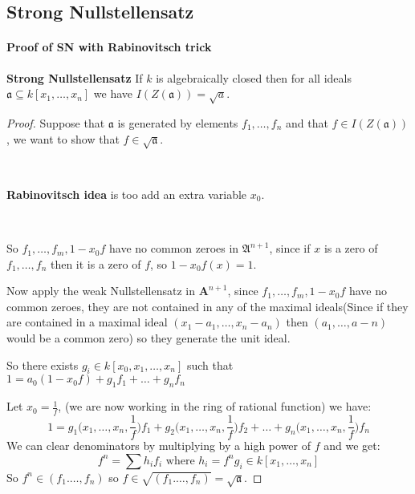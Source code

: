 \subsection{Strong Nullstellensatz}

\paragraph*{Proof of SN with Rabinovitsch trick}

\begin{theorem}\textbf{Strong Nullstellensatz}
    If $k$ is algebraically closed then for all ideals $\mathfrak{a}\subseteq k[x_1,\dots,x_n]$ we have $I(Z(\mathfrak{a})) = \sqrt{a}$.

\begin{proof}
    
Suppose that $\mathfrak{a}$ is generated by elements $f_1,\dots,f_n$ and that $f\in I(Z(\mathfrak{a}))$, we want to show that $f\in\sqrt{\mathfrak{a}}$.

\ 

\textbf{Rabinovitsch idea} is too add an extra variable $x_0$.

\

So $f_1,\dots,f_m,1-x_0f$ have no common zeroes in $\mathfrak{A}^{n+1}$, since if $x$ is a zero of $f_1,\dots,f_n$ then it is a zero of $f$, so $1-x_0f(x) = 1$.

Now apply the weak Nullstellensatz in $\mathbf{A}^{n+1}$, since $f_1,\dots,f_m,1-x_0f$ have no common zeroes, they are not contained in any of the maximal ideals(Since if they are contained in a maximal ideal $(x_1-a_1,\dots,x_n-a_n)$ then $(a_1,\dots,a-n)$ would be a common zero) so they generate the unit ideal.

So there exists $g_i\in k[x_0,x_1,\dots,x_n]$ such that $1 = a_0(1-x_0f)+g_1f_1+\dots+{g_n}{f_n}$

Let $x_0 = \frac{1}{f}$, (we are now working in the ring of rational function) we have:\begin{equation*}
    1 = g_1\bigg(x_1,\dots,x_n,\frac{1}{f}\bigg)f_1+g_2\bigg(x_1,\dots,x_n,\frac{1}{f}\bigg)f_2+\dots+g_n\bigg(x_1,\dots,x_n,\frac{1}{f}\bigg)f_n
\end{equation*}
We can clear denominators by multiplying by a high power of $f$ and we get:\begin{equation*}
    f^n = \sum h_if_i \text{ where }h_i = {f^n}{g_i}\in k[x_1,\dots,x_n]
\end{equation*}
So $f^n\in (f_1.\dots,f_n)$ so $f\in \sqrt{(f_1.\dots,f_n)} = \sqrt{\mathfrak{a}}$.
\end{proof}
\end{theorem}
